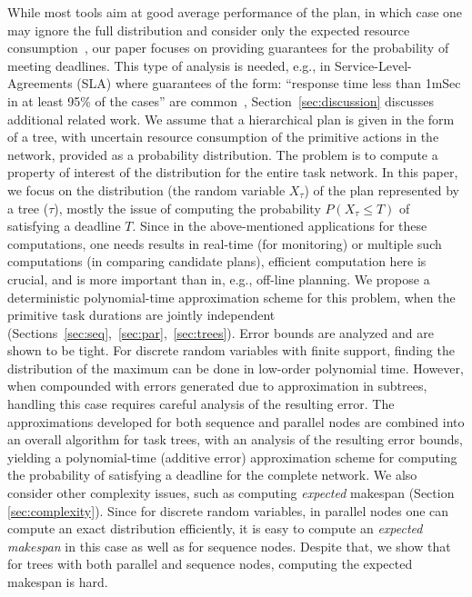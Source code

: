 \documentclass[review]{elsarticle}
\begin{document}
While most tools aim at good average performance of the plan, in which case one may ignore the 
full distribution and consider only the expected resource consumption~\cite{bonfietti2014disregarding}, our paper focuses
on providing guarantees for the probability of meeting deadlines. This type of analysis is needed, e.g., in
Service-Level-Agreements (SLA) where guarantees of the form: ``response time less than 1mSec in at least 95\% of the cases'' are common~\cite{buyya2011sla}, 
Section~\ref{sec:discussion} discusses additional related work.
We assume that a hierarchical plan is given in the form of a tree, with uncertain resource consumption of the primitive actions in the network, provided as a probability distribution. The problem is to compute a property of interest of the distribution for the entire task
 network. 
In this paper, we focus on the distribution 
(the random variable $X_\tau$) of the plan represented by a tree ($\tau$),
mostly the issue of computing the probability $P(X_\tau \leq T)$ of satisfying a deadline $T$. Since in the above-mentioned applications for these computations, one needs results in real-time (for monitoring) or multiple such computations (in comparing candidate plans), efficient computation here is crucial, and is more important than in, e.g., off-line planning.
We propose a deterministic polynomial-time approximation scheme for this problem, when the primitive task durations are jointly independent
(Sections~\ref{sec:seq},~\ref{sec:par},~\ref{sec:trees}). 
Error bounds are analyzed and are shown to be tight. For discrete random variables with finite support, finding the distribution of the maximum can be done in low-order polynomial time. However, when compounded with errors generated due to approximation in subtrees, handling this case requires careful analysis of the resulting error. The approximations developed for both sequence and parallel nodes are combined into an overall algorithm for task trees, with an analysis of the resulting error bounds, yielding a polynomial-time (additive error) approximation scheme for computing the probability of satisfying a deadline for the complete network. 
We also consider other complexity issues, such as
computing {\em expected} makespan (Section \ref{sec:complexity}). Since for discrete random variables, in parallel nodes one can compute an exact distribution efficiently, it is easy to compute an {\em expected makespan} in this case as well as for sequence nodes. Despite that,  we show that for trees with both parallel and sequence nodes, computing the expected makespan is hard.
\end{document}
